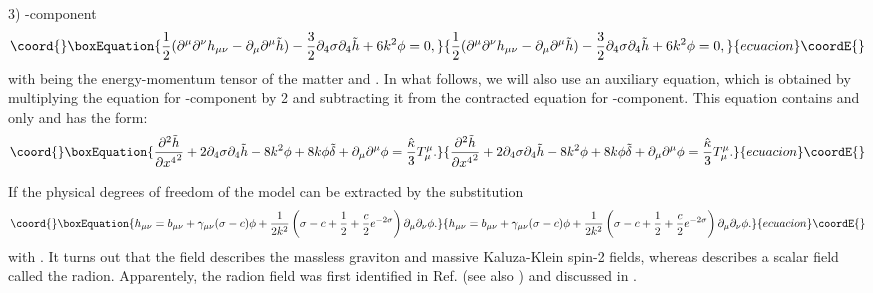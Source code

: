 \documentclass[a4paper,12pt]{article}
\begin{document}
 3) \coordHE{}-component
\begin{equation}\coord{}\boxEquation{\label{4-4}
\frac{1}{2}(\partial^\mu \partial^\nu  h_{\mu\nu} - \partial_\mu
\partial^\mu \tilde h ) - \frac{3}{2}\partial_4 \sigma \partial_4 \tilde h
+ 6 k^2 \phi =0,
}{\frac{1}{2}(\partial^\mu \partial^\nu  h_{\mu\nu} - \partial_\mu
\partial^\mu \tilde h ) - \frac{3}{2}\partial_4 \sigma \partial_4 \tilde h
+ 6 k^2 \phi =0,
}{ecuacion}\coordE{}\end{equation}
with \coordHE{} being the energy-momentum tensor of the matter
and \coordHE{}. In what follows, we will
also use an auxiliary equation, which is obtained by multiplying
the equation for \coordHE{}-component by 2 and subtracting it from the
contracted equation for \myHighlight{$\mu\nu$}\coordHE{}-component. This equation contains
\coordHE{} and \myHighlight{$\phi$}\coordHE{} only and has the form:
\begin{equation}\coord{}\boxEquation{\label{contracted-44}
\frac{\partial^2 \tilde h}{\partial {x^4}^2}  + 2\partial_4 \sigma \partial_4 \tilde h
  -8k^2 \phi+ 8k \phi \tilde \delta + \partial_\mu \partial^\mu \phi =
\frac{\hat \kappa}{3} T_{\mu}^{\mu}.
}{\frac{\partial^2 \tilde h}{\partial {x^4}^2}  + 2\partial_4 \sigma \partial_4 \tilde h
  -8k^2 \phi+ 8k \phi \tilde \delta + \partial_\mu \partial^\mu \phi =
\frac{\hat \kappa}{3} T_{\mu}^{\mu}.
}{ecuacion}\coordE{}\end{equation}

If \coordHE{} the physical degrees of freedom of  the model
can be extracted by the substitution \cite{BKSV}
\begin{equation}\coord{}\boxEquation{\label{substitution}
 h_{\mu\nu} =  b_{\mu\nu} + \gamma_{\mu\nu}(\sigma - c)\phi +
 \frac{1}{2k^2} \left(\sigma - c +\frac{1}{2} +
 \frac{c}{2}e^{-2\sigma}\right) \partial_\mu \partial_\nu \phi.
}{h_{\mu\nu} =  b_{\mu\nu} + \gamma_{\mu\nu}(\sigma - c)\phi +
 \frac{1}{2k^2} \left(\sigma - c +\frac{1}{2} +
 \frac{c}{2}e^{-2\sigma}\right) \partial_\mu \partial_\nu \phi.
}{ecuacion}\coordE{}\end{equation}
with \coordHE{}. It turns out that the field
\coordHE{} describes the massless graviton
\cite{RS1,RS2} and massive Kaluza-Klein spin-2 fields, whereas
\coordHE{} describes a scalar field called the radion.
Apparentely, the radion field was first identified in Ref.
\cite{ADM} (see also \cite{Sundr}) and discussed
in  \cite{CGR,CGRT,wise2,Das}.
\end{document}
